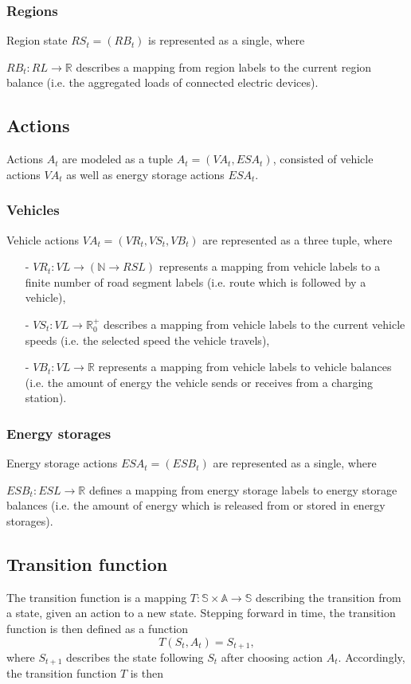 \subsubsection{Regions}
Region state
$
	RS_t = (RB_t)
$
is represented as a single, where

$
	RB_t: RL \rightarrow \mathbb{R}
$ describes a mapping from region labels to the current region balance (i.e. the aggregated loads of connected electric devices).

\subsection{Actions}
Actions $A_t$ are modeled as a tuple 
$
	A_t = (VA_t, ESA_t)
$, consisted of vehicle actions $VA_t$ as well as energy storage actions $ESA_t$.

\subsubsection{Vehicles}
Vehicle actions
$
	VA_t = (VR_t, VS_t, VB_t)
$ are represented as a three tuple, where
\begin{itemize}
	\item[-]
$
	VR_t: VL \rightarrow (\mathbb{N} \rightarrow RSL)
$ represents a mapping from vehicle labels to a finite number of road segment labels (i.e. route which is followed by a vehicle),
	\item[-]
$
	VS_t: VL \rightarrow \mathbb{R}_0^+
$ describes a mapping from vehicle labels to the current vehicle speeds (i.e. the selected speed the vehicle travels),
	\item[-]
$
	VB_t: VL \rightarrow \mathbb{R}
$ represents a mapping from vehicle labels to vehicle balances (i.e. the amount of energy the vehicle sends or receives from a charging station).
\end{itemize}

\subsubsection{Energy storages}
Energy storage actions 
$
	ESA_t = (ESB_t)
$ are represented as a single, where

$
	ESB_t: ESL \rightarrow \mathbb{R}
$ defines a mapping from energy storage labels to energy storage balances (i.e. the amount of energy which is released from or stored in energy storages).

\subsection{Transition function}
The transition function is a mapping
$
	T: \mathbb{S} \times \mathbb{A} \rightarrow \mathbb{S}
$ describing the transition from a state, given an action to a new state.
Stepping forward in time, the transition function is then defined as a function
\[
	T(S_t, A_t) = S_{t+1} \mathrm{,}
\]where $S_{t+1}$ describes the state following $S_t$ after choosing action $A_t$. Accordingly, the transition function $T$ is then

